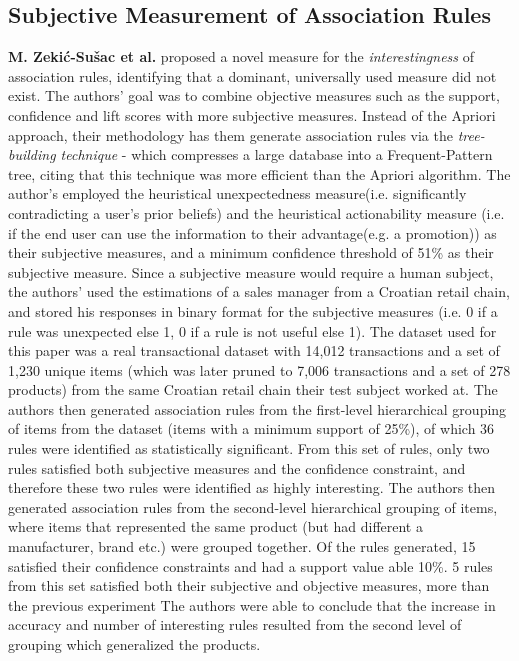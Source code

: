 \documentclass[paper=a4,fontsize=11pt]{report}	%
\begin{document}
\subsection{Subjective Measurement of Association Rules}
\textbf{M. Zekić-Sušac et al.} \cite{market_ass} proposed a novel measure for the \textit{interestingness} of association rules,  identifying that a dominant, universally used measure did not exist. The authors' goal was to combine objective measures such as the support, confidence and lift scores with more subjective measures. Instead of the Apriori approach, their methodology has them generate association rules via the \textit{tree-building technique} - which compresses a large database into a Frequent-Pattern tree, citing that this technique was more efficient than the Apriori algorithm. The author's employed the heuristical unexpectedness measure(i.e.  significantly contradicting a user's prior beliefs) and the heuristical actionability measure (i.e. if the end user can use the information to their advantage(e.g. a promotion)) as their subjective measures, and a minimum confidence threshold of 51\% as their subjective measure.  Since a subjective measure would require a human subject, the authors' used the estimations of a sales manager from a Croatian retail chain, and stored his responses in binary format for the subjective measures (i.e. 0 if a rule was unexpected else 1, 0 if a rule is not useful else 1). The dataset used for this paper was a real transactional dataset with 14,012 transactions and a set of 1,230 unique items (which was later pruned to 7,006 transactions and a set of 278 products) from the same Croatian retail chain their test subject worked at. The authors then generated association rules from the first-level hierarchical grouping of items from the dataset (items with a minimum support of 25\%),  of which 36 rules were identified as statistically significant.  From this set of rules, only two rules satisfied both subjective measures and the confidence constraint, and therefore these two rules were identified as highly interesting.  The authors then generated association rules from the second-level hierarchical grouping of items, where items that represented the same product (but had different a manufacturer, brand etc.) were grouped together. Of the rules generated, 15 satisfied their confidence constraints and had a support value able 10\%. 5 rules from this set satisfied both their subjective and objective measures,  more than the previous experiment  The authors were able to conclude that the increase in accuracy and number of interesting rules resulted from the second level of grouping which generalized the products.\\
\end{document}
